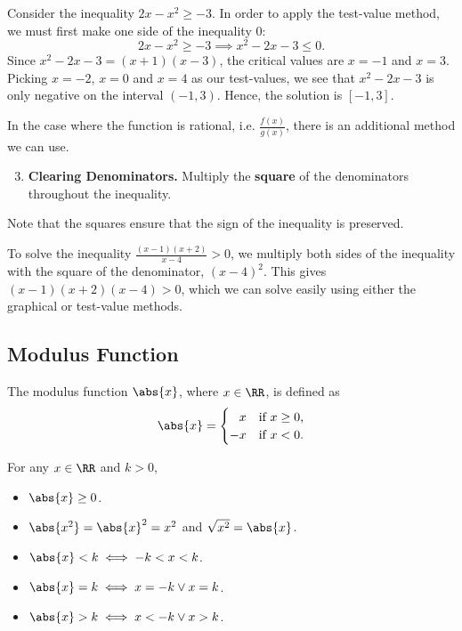 \begin{example}
    Consider the inequality $2x - x^2 \geq -3$. In order to apply the test-value method, we must first make one side of the inequality 0: \[2x - x^2 \geq -3 \implies x^2 - 2x - 3 \leq 0.\] Since $x^2 - 2x - 3 = (x+1)(x-3)$, the critical values are $x = -1$ and $x = 3$. Picking $x = -2$, $x = 0$ and $x = 4$ as our test-values, we see that $x^2 - 2x - 3$ is only negative on the interval $(-1, 3)$. Hence, the solution is $[-1, 3]$.
\end{example}

In the case where the function is rational, i.e. $\frac{f(x)}{g(x)}$, there is an additional method we can use.
\begin{enumerate}
    \setcounter{enumi}{2}
    \item \textbf{Clearing Denominators.} Multiply the \textbf{square} of the denominators throughout the inequality.
\end{enumerate}
Note that the squares ensure that the sign of the inequality is preserved.

\begin{example}
    To solve the inequality $\frac{(x-1)(x + 2)}{x - 4} > 0$, we multiply both sides of the inequality with the square of the denominator, $(x-4)^2$. This gives $(x-1)(x+2)(x-4) > 0$, which we can solve easily using either the graphical or test-value methods.
\end{example}

\subsection{Modulus Function}

\begin{definition}
    The modulus function $\abs{x}$, where $x \in \RR$, is defined as \[\abs{x} = \begin{cases}
        \phantom{-}x & \text{if $x \geq 0$,}\\
        -x & \text{if $x < 0$.}
    \end{cases}\]
\end{definition}

\begin{fact}
    For any $x \in \RR$ and $k > 0$,
    \begin{itemize}
        \item $\abs{x} \geq 0$.
        \item $\abs{x^2} = \abs{x}^2 = x^2$ and $\sqrt{x^2} = \abs{x}$.
        \item $\abs{x} < k \iff -k < x < k$.
        \item $\abs{x} = k \iff x = -k \lor x = k$.
        \item $\abs{x} > k \iff x < -k \lor x > k$.
    \end{itemize}
\end{fact}